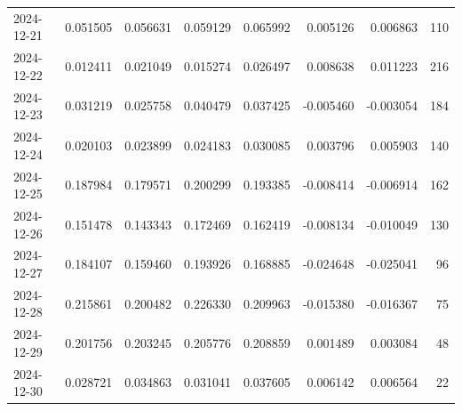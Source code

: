 \begin{tabular}{lrrrrrrr}
2024-12-21 & 0.051505 & 0.056631 & 0.059129 & 0.065992 & 0.005126 & 0.006863 & 110 \\
2024-12-22 & 0.012411 & 0.021049 & 0.015274 & 0.026497 & 0.008638 & 0.011223 & 216 \\
2024-12-23 & 0.031219 & 0.025758 & 0.040479 & 0.037425 & -0.005460 & -0.003054 & 184 \\
2024-12-24 & 0.020103 & 0.023899 & 0.024183 & 0.030085 & 0.003796 & 0.005903 & 140 \\
2024-12-25 & 0.187984 & 0.179571 & 0.200299 & 0.193385 & -0.008414 & -0.006914 & 162 \\
2024-12-26 & 0.151478 & 0.143343 & 0.172469 & 0.162419 & -0.008134 & -0.010049 & 130 \\
2024-12-27 & 0.184107 & 0.159460 & 0.193926 & 0.168885 & -0.024648 & -0.025041 & 96 \\
2024-12-28 & 0.215861 & 0.200482 & 0.226330 & 0.209963 & -0.015380 & -0.016367 & 75 \\
2024-12-29 & 0.201756 & 0.203245 & 0.205776 & 0.208859 & 0.001489 & 0.003084 & 48 \\
2024-12-30 & 0.028721 & 0.034863 & 0.031041 & 0.037605 & 0.006142 & 0.006564 & 22 \\
\bottomrule
\end{tabular}

